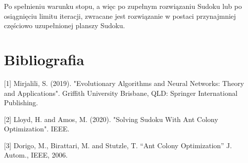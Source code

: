 \documentclass[11pt]{scrartcl} %
\begin{document}
Po spełnieniu warunku stopu, a więc po zupełnym rozwiązaniu Sudoku lub po osiągnięciu limitu iteracji, zwracane jest rozwiązanie w postaci przynajmniej częściowo uzupełnionej planszy Sudoku.

\section{Bibliografia}
[1] Mirjalili, S. (2019). "Evolutionary Algorithms and Neural Networks: Theory and Applications". Griffith University Brisbane, QLD: Springer International Publishing.

[2] Lloyd, H. and Amos, M. (2020). "Solving Sudoku With Ant Colony Optimization". IEEE.

[3] Dorigo, M., Birattari, M. and Stutzle, T. “Ant Colony Optimization” J. Autom., IEEE, 2006.
\end{document}
